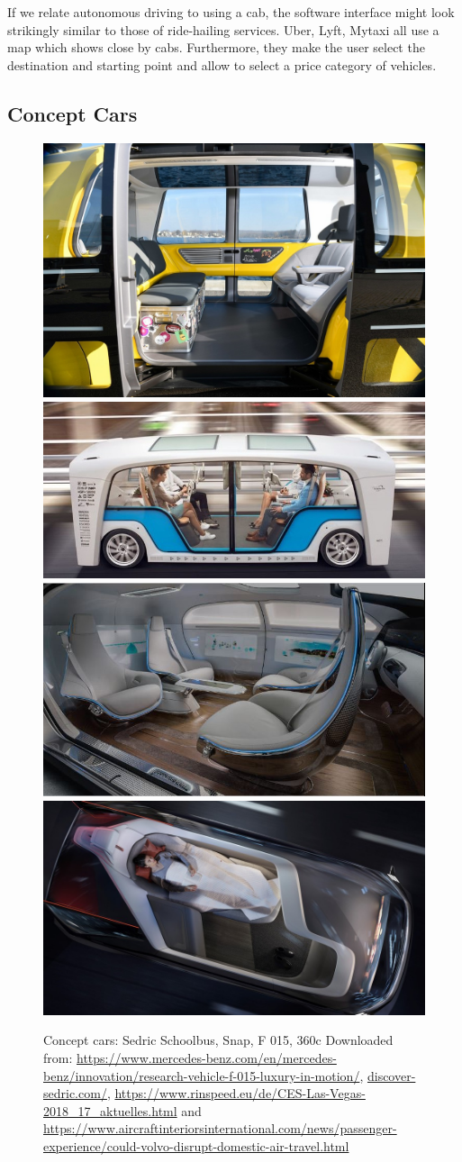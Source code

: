 If we relate autonomous driving to using a cab, the software interface might look strikingly similar to those of ride-hailing services. Uber, Lyft, Mytaxi all use a map which shows close by cabs. Furthermore, they make the user select the destination and starting point and allow to select a price category of vehicles.  

\subsection{Concept Cars}
\label{sec:conceptcars}
\begin{figure}
    \includegraphics[height=0.27\textwidth]{fig/school_bus_Mittel.jpg}\hfill\includegraphics[height=0.27\textwidth]{fig/snap.jpg}\newline\includegraphics[height=0.276\textwidth]{fig/mercedes.JPG}\hfill\includegraphics[height=0.276\textwidth]{fig/360c_Mittel.jpg}
    \caption[Concept Cars]{Concept cars: Sedric Schoolbus, Snap, F 015, 360c Downloaded from: \url{https://www.mercedes-benz.com/en/mercedes-benz/innovation/research-vehicle-f-015-luxury-in-motion/}, \url{discover-sedric.com/}, \url{https://www.rinspeed.eu/de/CES-Las-Vegas-2018_17_aktuelles.html} and \url{https://www.aircraftinteriorsinternational.com/news/passenger-experience/could-volvo-disrupt-domestic-air-travel.html}}
    \label{fig:conceptcars}
\end{figure}
